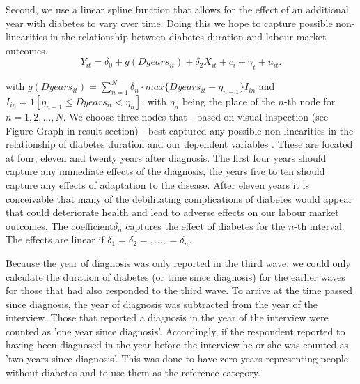 Second, we use a linear spline function that allows for the effect
of an additional year with diabetes to vary over time. Doing this
we hope to capture possible non-linearities in the relationship between
diabetes duration and labour market outcomes. 
\begin{equation}
Y_{it}=\delta_{0}+g(Dyears_{it})+\delta_{2}X_{it}+c_{i}+\gamma_{t}+u_{it}.\label{eq:splines}
\end{equation}


\noindent with $g(Dyears_{it})=\sum_{n=1}^{N}\delta_{n}\cdot max\{Dyears_{it}-\eta_{n-1}\}I_{in}$
and $I_{in}=1[\eta_{n-1}\leq Dyears_{it}<\eta_{n}]$, with $\eta_{n}$
being the place of the $n$-th node for $n=1,2,\ldots,N$. We choose
three nodes that - based on visual inspection (see Figure Graph in
result section) - best captured any possible non-linearities in the
relationship of diabetes duration and our dependent variables . These
are located at four, eleven and twenty years after diagnosis. The
first four years should capture any immediate effects of the diagnosis,
the years five to ten should capture any effects of adaptation to
the disease. After eleven years it is conceivable that many of the
debilitating complications of diabetes would appear that could deteriorate
health and lead to adverse effects on our labour market outcomes.
The coefficient$\delta_{n}$ captures the effect of diabetes for the
$n$-th interval. The effects are linear if $\delta_{1}=\delta_{2}=,\ldots,=\delta_{n}$.

Because the year of diagnosis was only reported in the third wave,
we could only calculate the duration of diabetes (or time since diagnosis)
for the earlier waves for those that had also responded to the third
wave. To arrive at the time passed since diagnosis, the year of diagnosis
was subtracted from the year of the interview. Those that reported
a diagnosis in the year of the interview were counted as 'one year
since diagnosis'. Accordingly, if the respondent reported to having
been diagnosed in the year before the interview he or she was counted
as 'two years since diagnosis'. This was done to have zero years representing
people without diabetes and to use them as the reference category.

